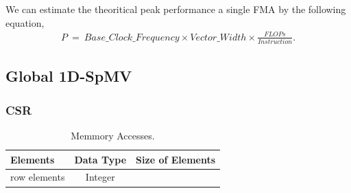 \documentclass[conference, 10ppt]{IEEEtran}
\begin{document}

We can estimate the theoritical peak performance a single FMA by the following equation,
\begin{eqnarray}
P\ =\ Base\_Clock\_Frequency\times Vector\_Width\times \frac{FLOPs}{Instruction}.
\end{eqnarray}

\subsection{Global 1D-SpMV}
\subsubsection{CSR}
\begin{table}[htb]
\caption{Memmory Accesses.}
\label{tab:g1d-csr-spmv-mem-access}
\centering
\begin{tabular}[c]{| l | c | c |}
\hline
Elements & Data Type & Size of Elements \\ \hline
row elements & Integer & 
\end{tabular}
\end{table}



\end{document}
